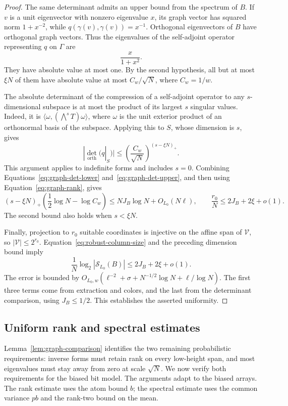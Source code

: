 \begin{proof}
The same determinant admits an upper bound from the spectrum of
\(B\). If \(v\) is a unit eigenvector with nonzero eigenvalue
\(x\), its graph vector has squared norm \(1+x^{-2}\), while
\(q(\gamma(v),\gamma(v))=x^{-1}\). Orthogonal eigenvectors of
\(B\) have orthogonal graph vectors. Thus the eigenvalues of the
self-adjoint operator representing \(q\) on \(\Gamma\) are
\[
 \frac{x}{1+x^2}.
\]
They have absolute value at most one. By the second hypothesis,
all but at most \(\xi N\) of them have absolute value at most
\(C_w/\sqrt N\), where \(C_w=1/w\).

The absolute determinant of the compression of a self-adjoint
operator to any \(s\)-dimensional subspace is at most the product
of its largest \(s\) singular values. Indeed, it is
\(\langle\omega,(\bigwedge^s T)\omega\rangle\), where \(\omega\) is the
unit exterior product of an orthonormal basis of the subspace.
Applying this to \(S\), whose dimension is \(s\), gives
\begin{equation}\label{eq:graph-det-upper}
 |\det_{\mathrm{orth}}(q|_S)|
 \le\left(\frac{C_w}{\sqrt N}\right)^{(s-\xi N)_+}.
\end{equation}
This argument applies to indefinite forms and includes \(s=0\).
Combining Equations~\eqref{eq:graph-det-lower}
and~\eqref{eq:graph-det-upper}, and then using
Equation~\eqref{eq:graph-rank}, gives
\[
 (s-\xi N)_+
   \left(\frac12\log N-\log C_w\right)
 \le NJ_B\log N+O_{L_0}(N\ell),
 \qquad
 \frac{r_0}{N}\le2J_B+2\xi+o(1).
\]
The second bound also holds when \(s<\xi N\).

Finally, projection to \(r_0\) suitable coordinates is injective
on the affine span of \(\mathcal V\), so
\(|\mathcal V|\le2^{r_0}\). Equation~\eqref{eq:robust-column-size} and the preceding
dimension bound imply
\[
 \frac1N\log_2|\mathcal S_{L_0}(B)|
 \le 2J_B+2\xi+o(1).
\]
The error is bounded by
\(O_{L_0,w}(\ell^{-2}+\sigma+N^{-1/2}\log N+\ell/\log N)\).
The first three terms come from extraction and colors, and the last
from the determinant comparison, using \(J_B\le1/2\). This
establishes the asserted uniformity.
\end{proof}

\subsection{Uniform rank and spectral estimates}

Lemma~\ref{lem:graph-comparison} identifies the two remaining
probabilistic requirements: inverse forms must retain rank on every
low-height span, and most eigenvalues must stay away from zero at
scale \(\sqrt N\). We now verify both requirements for the biased
bit model. The arguments adapt
\cite[Corollary~5.2 and Proposition~5.4]{SymmetricRate} to the biased
arrays. The rank estimate uses the atom bound \(b\); the spectral
estimate uses the common variance \(pb\) and the rank-two bound
on the mean.


